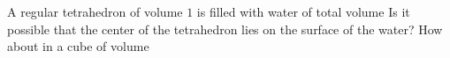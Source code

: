 A regular tetrahedron of volume $1$ is filled with water of total volume  Is it possible that the center of the tetrahedron lies on the surface of the water? How about in a cube of volume 